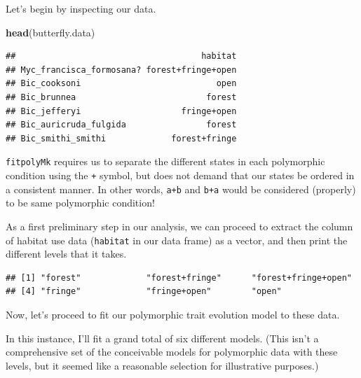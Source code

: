 \documentclass[fleqn,10pt,lineno]{wlpeerj} %
\newenvironment{Shaded}{\begin{snugshade}}{\end{snugshade}}
\newcommand{\FunctionTok}[1]{\textcolor[rgb]{0.13,0.29,0.53}{\textbf{#1}}}
\newcommand{\NormalTok}[1]{#1}
\newcommand{\OtherTok}[1]{\textcolor[rgb]{0.56,0.35,0.01}{#1}}
\newcommand{\SpecialCharTok}[1]{\textcolor[rgb]{0.81,0.36,0.00}{\textbf{#1}}}
\begin{document}
Let's begin by inspecting our data.

\begin{Shaded}
\begin{Highlighting}[]
\FunctionTok{head}\NormalTok{(butterfly.data)}
\end{Highlighting}
\end{Shaded}

\begin{verbatim}
##                                     habitat
## Myc_francisca_formosana? forest+fringe+open
## Bic_cooksoni                           open
## Bic_brunnea                          forest
## Bic_jefferyi                    fringe+open
## Bic_auricruda_fulgida                forest
## Bic_smithi_smithi             forest+fringe
\end{verbatim}

\texttt{fitpolyMk} requires us to separate the different states in each polymorphic condition using the \texttt{+} symbol, but does not demand that our states be ordered in a consistent manner. In other words, \texttt{a+b} and \texttt{b+a} would be considered (properly) to be same polymorphic condition!

As a first preliminary step in our analysis, we can proceed to extract the column of habitat use data (\texttt{habitat} in our data frame) as a vector, and then print the different levels that it takes.

\begin{Shaded}
\end{Shaded}

\begin{verbatim}
## [1] "forest"             "forest+fringe"      "forest+fringe+open"
## [4] "fringe"             "fringe+open"        "open"
\end{verbatim}

Now, let's proceed to fit our polymorphic trait evolution model to these data.

In this instance, I'll fit a grand total of six different models. (This isn't a comprehensive set of the conceivable models for polymorphic data with these levels, but it seemed like a reasonable selection for illustrative purposes.)
\end{document}
